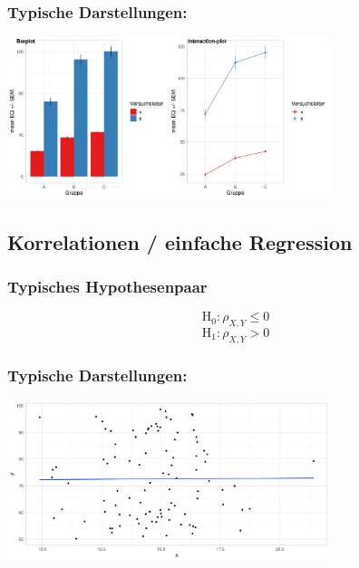 \documentclass[
]{book}
\begin{document}
\hypertarget{typische-darstellungen-2}{%
\subsubsection{Typische Darstellungen:}\label{typische-darstellungen-2}}

\begin{center}\includegraphics[width=266.666666666667pt]{imgs/mfVA} \end{center}

\hypertarget{korrelationen-einfache-regression}{%
\subsection{Korrelationen / einfache Regression}\label{korrelationen-einfache-regression}}

\hypertarget{typisches-hypothesenpaar-2}{%
\subsubsection{Typisches Hypothesenpaar}\label{typisches-hypothesenpaar-2}}

\[\text{H}_0: \rho_{X,Y}  \leq  0\]
\[\text{H}_1: \rho_{X,Y}  >  0\]

\hypertarget{typische-darstellungen-3}{%
\subsubsection{Typische Darstellungen:}\label{typische-darstellungen-3}}

\begin{center}\includegraphics[width=266.666666666667pt]{imgs/sc} \end{center}
\end{document}
